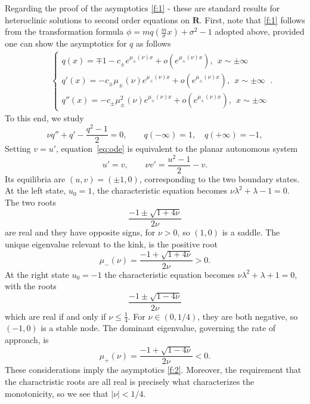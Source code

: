 \documentclass[12pt]{amsart}
\theoremstyle{definition}
\theoremstyle{remark}
\numberwithin{equation}{section}
\renewcommand{\(}{\left(}
\renewcommand{\)}{\right)}
\renewcommand{\[}{\left[}
\renewcommand{\]}{\right]}
\newcommand{\f}[2]{\frac{#1}{#2}}
\newcommand{\si}{\sigma}
\newcommand{\rone}{\mathbf R}
\begin{document}
	Regarding the proof of the asymptotics \eqref{f:1} - these are standard results for heteroclinic solutions to second order equations on $\rone$. First, note that \eqref{f:1} follows from the transformation formula $\phi=mq\left(\f{m}{\si} x\right)+\si^2-1$ adopted above, provided one can show the asymptotics for $q$ as follows \begin{eqnarray}
			\label{f:2} 
			& & \begin{cases}
				q(x)=\mp 1 - c_\pm e^{\mu_{\pm}(\nu) x} +o(e^{\mu_{\pm}(\nu) x} ), \ \ x\sim \pm \infty \\
				q'(x)=  - c_\pm \mu_{\pm}(\nu) e^{\mu_{\pm}(\nu) x} +o(e^{\mu_{\pm}(\nu) x} ),\ \ x\sim \pm \infty \\
				q''(x)=- c_\pm \mu^2_{\pm}(\nu) e^{\mu_{\pm}(\nu) x}+o(e^{\mu_{\pm}(\nu) x} ), \ \ x\sim \pm \infty 
			\end{cases}.
	\end{eqnarray}
To this end, we study \begin{equation}\label{eq:ode}
	\nu q'' + q' - \frac{q^2-1}{2} = 0, \qquad q(-\infty)=1,\quad q(+\infty)=-1,
\end{equation}
Setting $v = u'$, equation~\eqref{eq:ode}
is equivalent to the planar autonomous system
\begin{equation}\label{eq:system}
	u' = v, \qquad
	\nu v' = \frac{u^2-1}{2} - v.
\end{equation}
Its equilibria are $(u,v)=(\pm 1, 0)$, corresponding to the two boundary states. 
At the left state, $u_0 = 1$, the characteristic equation becomes $\nu\lambda^2 + \lambda - 1 = 0$. The two roots
$$
\frac{-1 \pm \sqrt{1+4\nu}}{2\nu}
$$
are real  and they have opposite signs, 
for $\nu > 0$,  so $(1,0)$ is a saddle. 
The unique eigenvalue relevant to the kink,  is the positive root
$$
	  \mu_-(\nu)=\frac{-1 + \sqrt{1+4\nu}}{2\nu}>0.
$$
At the right state $u_0 = -1$ 
the characteristic equation  becomes $\nu\lambda^2 + \lambda + 1 = 0$, with 
the roots
$$
 \frac{-1 \pm \sqrt{1-4\nu}}{2\nu}
$$
which are real if and only if $\nu \le \tfrac{1}{4}$.
For  $\nu \in (0, 1/4)$,  they are both negative, so $(-1,0)$ is a stable node. 
The dominant eigenvalue,  governing the
 rate of approach,  is
$$
\mu_+(\nu) = \frac{-1 + \sqrt{1-4\nu}}{2\nu} < 0.
$$
These considerations imply the asymptotics \eqref{f:2}. Moreover, the requirement that the charactristic roots are all real is precisely what characterizes the monotonicity, so we see that $|\nu|<1/4$.
\end{document}
